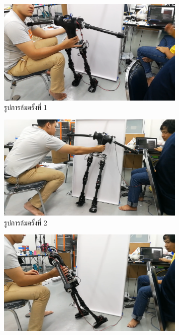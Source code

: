 \begin{figure}[!ht]
    \centering
    \begin{subfigure}[b]{0.4\linewidth}
      \includegraphics[width=\linewidth]{chapter4/images/fall1.png}
      \caption{รูปการล้มครั้งที่ 1}
    \end{subfigure}
    \begin{subfigure}[b]{0.4\linewidth}
      \includegraphics[width=\linewidth]{chapter4/images/fall2.png}
      \caption{รูปการล้มครั้งที่ 2}
    \end{subfigure}
    \begin{subfigure}[b]{0.4\linewidth}
      \includegraphics[width=\linewidth]{chapter4/images/fall3.png}

\end{subfigure}
\end{figure}
